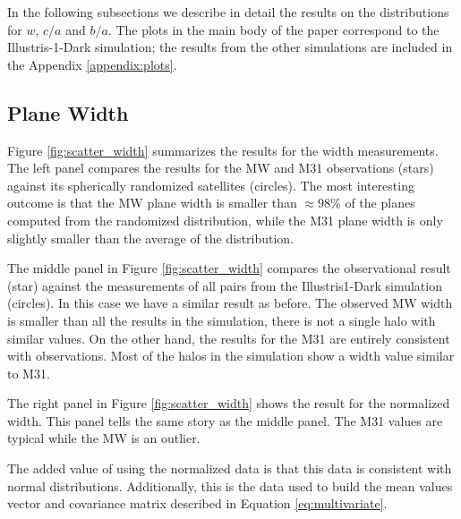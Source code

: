 \documentclass[a4paper,fleqn,usenatbib]{mnras}
\begin{document}
In the following subsections we describe in detail the results on the 
distributions for $w$, $c/a$ and $b/a$. 
The plots in the main body of the paper correspond to the
Illustris-1-Dark simulation; the results from the other simulations
are included in the Appendix \ref{appendix:plots}.

\subsection{Plane Width}

Figure \ref{fig:scatter_width} summarizes the results for the width
measurements.
The left panel compares the results for the MW and M31
observations (stars) against its spherically randomized satellites
(circles). 
The most interesting outcome is that the MW plane width is smaller
than $\approx 98\%$ of the planes computed from the randomized distribution,
while the M31 plane width is only slightly smaller than the average of
the distribution.

The middle panel in Figure \ref{fig:scatter_width} compares the
observational result (star) against the measurements of all pairs from the Illustris1-Dark
simulation (circles).
In this case we have a similar result as before. 
The observed MW width is smaller than all the results in the
simulation, there is not a single halo with similar values.
On the other hand, the results for the M31 are entirely consistent
with observations. Most of the halos in the simulation show a width
value similar to M31. 

The right panel in Figure \ref{fig:scatter_width} shows the result for
the normalized width.  
This panel tells the same story as the middle panel. 
The M31 values are typical while the MW is an outlier. 

The added value of using the normalized data is that this data is 
consistent with normal distributions.
Additionally, this is the data used to build the mean values vector and covariance
matrix described in Equation \ref{eq:multivariate}. 
\end{document}
